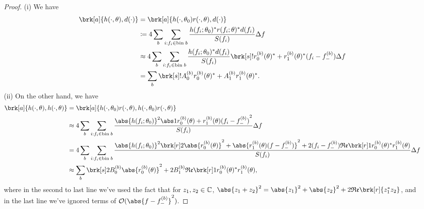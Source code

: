 \begin{proof}
(i) We have
\begin{align*}
\brk[a]{h(\cdot, \theta), d(\cdot)} &= \brk[a]{h(\cdot,\theta_0) r(\cdot,\theta), d(\cdot)}\\
&\defn 4 \sum_{b} \sum_{i:f_i \in \text{bin} \; b} \frac{h(f_i;\theta_0)^* r(f_i;\theta)^* d(f_i) }{S(f_i)}\Delta f \\
&\approx 4 \sum_{b} \sum_{i:f_i \in \text{bin} \; b} \frac{h(f_i;\theta_0)^* d(f_i) }{S(f_i)} \brk[s]!{r_0^{(b)}(\theta)^* + r_1^{(b)}(\theta)^*(f_i - f_-^{(b)})} \Delta f\\
&= \sum_b \brk[s]!{A_0^{(b)} r_0^{(b)}(\theta)^* + A_1^{(b)} r_1^{(b)}(\theta)^*}.
\end{align*}
(ii) On the other hand, we have
\begin{align*}
\brk[a]{h(\cdot,\theta), h(\cdot,\theta)} &= \brk[a]{h(\cdot,\theta_0) r(\cdot,\theta), h(\cdot,\theta_0) r(\cdot,\theta)}\\
&\approx 4 \sum_b \sum_{i:f_i \in \text{bin} \; b} \frac{\abs{h(f_i;\theta_0)}^2 \abs1{r_0^{(b)}(\theta) + r_1^{(b)}(\theta) (f_i-f_-^{(b)})}^2}{S(f_i)}\Delta f \\
&= 4 \sum_b \sum_{i:f_i \in \text{bin} \; b}\frac{\abs{h(f_i;\theta_0)}^2 \brk[r]2{\abs{r_0^{(b)}(\theta)}^2 + \abs{r_1^{(b)}(\theta)(f-f_-^{(b)})}^2 + 2(f_i-f_-^{(b)}) \re \brk[r]1{r_0^{(b)}(\theta)^*r_1^{(b)}(\theta)}}}{S(f_i)}\Delta f \\
&\approx \sum_b \brk[s]2{B_0^{(b)} \abs{r_0^{(b)}(\theta)}^2 + 2B_1^{(b)} \re \brk[r]1{r_0^{(b)}(\theta)^* r_1^{(b)}(\theta)}},
\end{align*}
where in the second to last line we've used the fact that for $z_1, z_2 \in \mathbb{C}$, $\abs{z_1+z_2}^2 = \abs{z_1}^2 + \abs{z_2}^2 + 2 \re \brk[r]{z_1^* z_2}$, and in the last line we've ignored terms of $\order(\abs{f-f_-^{(b)}}^2)$.
\end{proof}

